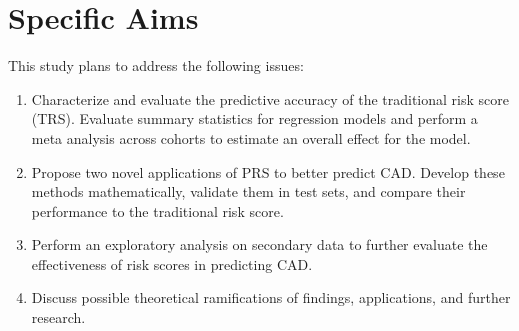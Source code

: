 \section{Specific Aims}

This study plans to address the following issues:

\begin{enumerate}
	\item Characterize and evaluate the predictive accuracy of the traditional risk score (\ac{TRS}). Evaluate summary statistics for regression models and perform a meta analysis across cohorts to estimate an overall effect for the model. 
	\item Propose two novel applications of \ac{PRS} to better predict \ac{CAD}. Develop these methods mathematically, validate them in test sets, and compare their performance to the traditional risk score.
	\item Perform an exploratory analysis on secondary data to further evaluate the effectiveness of risk scores in predicting \ac{CAD}.
	\item Discuss possible theoretical ramifications of findings, applications, and further research.
\end{enumerate}
